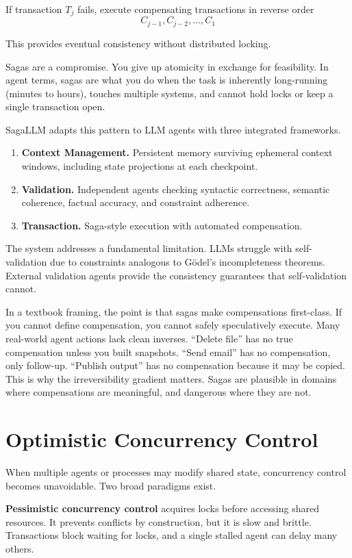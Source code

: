 If transaction $T_j$ fails, execute compensating transactions in reverse order
\[
C_{j-1}, C_{j-2}, \ldots, C_1
\]

This provides eventual consistency without distributed locking.

Sagas are a compromise. You give up atomicity in exchange for feasibility. In agent terms, sagas are what you do when the task is inherently long-running (minutes to hours), touches multiple systems, and cannot hold locks or keep a single transaction open.

SagaLLM \cite{chang2025sagallm} adapts this pattern to LLM agents with three integrated frameworks.
\begin{enumerate}
\item \textbf{Context Management.} Persistent memory surviving ephemeral context windows, including state projections at each checkpoint.
\item \textbf{Validation.} Independent agents checking syntactic correctness, semantic coherence, factual accuracy, and constraint adherence.
\item \textbf{Transaction.} Saga-style execution with automated compensation.
\end{enumerate}

The system addresses a fundamental limitation. LLMs struggle with self-validation due to constraints analogous to G\"{o}del's incompleteness theorems. External validation agents provide the consistency guarantees that self-validation cannot.

In a textbook framing, the point is that sagas make compensations first-class. If you cannot define compensation, you cannot safely speculatively execute. Many real-world agent actions lack clean inverses. ``Delete file'' has no true compensation unless you built snapshots. ``Send email'' has no compensation, only follow-up. ``Publish output'' has no compensation because it may be copied. This is why the irreversibility gradient matters. Sagas are plausible in domains where compensations are meaningful, and dangerous where they are not.
\section{Optimistic Concurrency Control}

When multiple agents or processes may modify shared state, concurrency control becomes unavoidable. Two broad paradigms exist.

\textbf{Pessimistic concurrency control} acquires locks before accessing shared resources. It prevents conflicts by construction, but it is slow and brittle. Transactions block waiting for locks, and a single stalled agent can delay many others.

